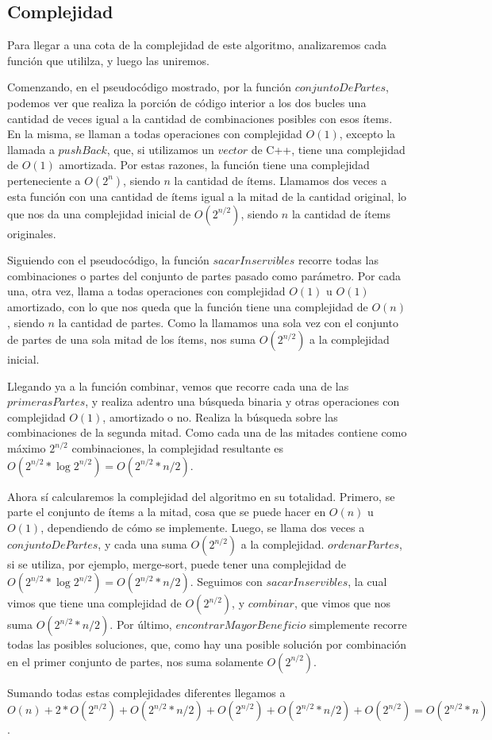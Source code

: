 \documentclass[10pt, a4paper]{article}
\begin{document}
\subsection{Complejidad}
Para llegar a una cota de la complejidad de este algoritmo, analizaremos cada función que utililza, y luego las uniremos.\par
Comenzando, en el pseudocódigo mostrado, por la función $conjuntoDePartes$, podemos ver que realiza la porción de código interior a los dos bucles una cantidad de veces igual a la cantidad de combinaciones posibles con esos ítems. En la misma, se llaman a todas operaciones con complejidad $O(1)$, excepto la llamada a $pushBack$, que, si utilizamos un $vector$ de C++, tiene una complejidad de $O(1)$ amortizada. Por estas razones, la función tiene una complejidad perteneciente a $O(2^n)$, siendo $n$ la cantidad de ítems. Llamamos dos veces a esta función con una cantidad de ítems igual a la mitad de la cantidad original, lo que nos da una complejidad inicial de $O(2^{n/2})$, siendo $n$ la cantidad de ítems originales.\par
Siguiendo con el pseudocódigo, la función $sacarInservibles$ recorre todas las combinaciones o partes del conjunto de partes pasado como parámetro. Por cada una, otra vez, llama a todas operaciones con complejidad $O(1)$ u $O(1)$ amortizado, con lo que nos queda que la función tiene una complejidad de $O(n)$, siendo $n$ la cantidad de partes. Como la llamamos una sola vez con el conjunto de partes de una sola mitad de los ítems, nos suma $O(2^{n/2})$ a la complejidad inicial.\par
Llegando ya a la función combinar, vemos que recorre cada una de las $primerasPartes$, y realiza adentro una búsqueda binaria y otras operaciones con complejidad $O(1)$, amortizado o no. Realiza la búsqueda sobre las combinaciones de la segunda mitad. Como cada una de las mitades contiene como máximo $2^{n/2}$ combinaciones, la complejidad resultante es $O(2^{n/2} * \log{}2^{n/2}) = O(2^{n/2} * n/2)$.\par
Ahora sí calcularemos la complejidad del algoritmo en su totalidad. Primero, se parte el conjunto de ítems a la mitad, cosa que se puede hacer en $O(n)$ u $O(1)$, dependiendo de cómo se implemente. Luego, se llama dos veces a $conjuntoDePartes$, y cada una suma $O(2^{n/2})$ a la complejidad. $ordenarPartes$, si se utiliza, por ejemplo, merge-sort, puede tener una complejidad de $O(2^{n/2} * \log{}2^{n/2}) = O(2^{n/2} * n/2)$. Seguimos con $sacarInservibles$, la cual vimos que tiene una complejidad de $O(2^{n/2})$, y $combinar$, que vimos que nos suma $O(2^{n/2} * n/2)$. Por último, $encontrarMayorBeneficio$ simplemente recorre todas las posibles soluciones, que, como hay una posible solución por combinación en el primer conjunto de partes, nos suma solamente $O(2^{n/2})$.\par
Sumando todas estas complejidades diferentes llegamos a $O(n) + 2 * O(2^{n/2}) + O(2^{n/2} * n/2) + O(2^{n/2}) + O(2^{n/2} * n/2) + O(2^{n/2}) = O(2^{n/2} * n)$.
\end{document}
